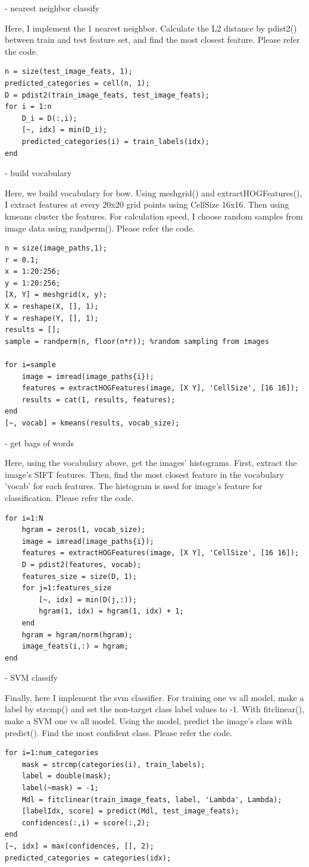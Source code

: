 - nearest neighbor classify

Here, I implement the 1 nearest neighbor. Calculate the L2 distance by pdist2() between train and test feature set, and find the most closest feature. Please refer the code.
\begin{lstlisting}[style=Matlab-editor]
n = size(test_image_feats, 1);
predicted_categories = cell(n, 1);
D = pdist2(train_image_feats, test_image_feats);
for i = 1:n
    D_i = D(:,i);
    [~, idx] = min(D_i);
    predicted_categories(i) = train_labels(idx);
end
\end{lstlisting}

- build vocabulary

Here, we build vocabulary for bow. Using meshgrid() and extractHOGFeatures(), I extract features at every 20x20 grid points using CellSize 16x16. Then using kmeans cluster the features. For calculation speed, I choose random samples from image data using randperm(). Please refer the code.
\begin{lstlisting}[style=Matlab-editor]
n = size(image_paths,1);
r = 0.1;
x = 1:20:256;
y = 1:20:256;
[X, Y] = meshgrid(x, y);
X = reshape(X, [], 1);
Y = reshape(Y, [], 1);
results = [];
sample = randperm(n, floor(n*r)); %random sampling from images

for i=sample
    image = imread(image_paths{i});
    features = extractHOGFeatures(image, [X Y], 'CellSize', [16 16]);
    results = cat(1, results, features);
end
[~, vocab] = kmeans(results, vocab_size);
\end{lstlisting}

- get bags of words

Here, using the vocabulary above, get the images' histograms. First, extract the image's SIFT features. Then, find the most closest feature in the vocabulary 'vocab' for each features. The histogram is used for image's feature for classification. Please refer the code.
\begin{lstlisting}[style=Matlab-editor]
for i=1:N
    hgram = zeros(1, vocab_size);
    image = imread(image_paths{i});
    features = extractHOGFeatures(image, [X Y], 'CellSize', [16 16]);
    D = pdist2(features, vocab);
    features_size = size(D, 1);
    for j=1:features_size
        [~, idx] = min(D(j,:));
        hgram(1, idx) = hgram(1, idx) + 1;
    end
    hgram = hgram/norm(hgram);
    image_feats(i,:) = hgram;
end
\end{lstlisting}

- SVM classify

Finally, here I implement the svm classifier. For training one vs all model, make a label by strcmp() and set the non-target class label values to -1. With fitclinear(), make a SVM one vs all model. Using the model, predict the image's class with predict(). Find the most confident class. Please refer the code.
\begin{lstlisting}[style=Matlab-editor]
for i=1:num_categories
    mask = strcmp(categories(i), train_labels);
    label = double(mask);
    label(~mask) = -1;
    Mdl = fitclinear(train_image_feats, label, 'Lambda', Lambda);
    [labelIdx, score] = predict(Mdl, test_image_feats);
    confidences(:,i) = score(:,2);
end
[~, idx] = max(confidences, [], 2);
predicted_categories = categories(idx);
\end{lstlisting}
